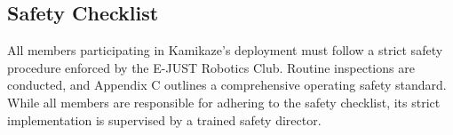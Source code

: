 \subsection{Safety Checklist}

All members participating in Kamikaze’s deployment must follow a strict safety procedure enforced by the E-JUST Robotics Club. Routine inspections are conducted, and Appendix C outlines a comprehensive operating safety standard. While all members are responsible for adhering to the safety checklist, its strict implementation is supervised by a trained safety director.
